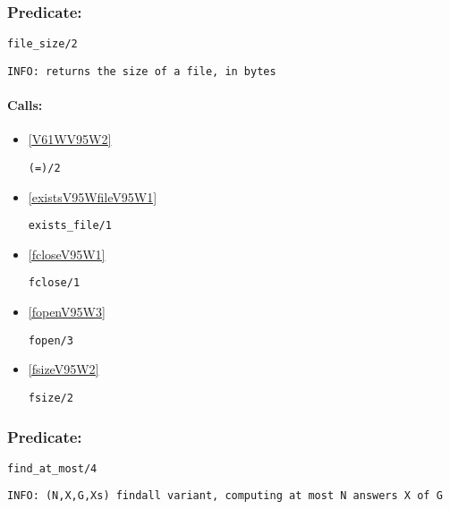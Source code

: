 \subsubsection{Predicate:} \label{fileV95WsizeV95W2}

\begin{verbatim}
file_size/2
\end{verbatim}

{\small \begin{verbatim}
INFO: returns the size of a file, in bytes

\end{verbatim}}
\paragraph{Calls:} 
\begin{itemize}
\item \ref{V61WV95W2} 
\begin{verbatim}
(=)/2
\end{verbatim}

\item \ref{existsV95WfileV95W1} 
\begin{verbatim}
exists_file/1
\end{verbatim}

\item \ref{fcloseV95W1} 
\begin{verbatim}
fclose/1
\end{verbatim}

\item \ref{fopenV95W3} 
\begin{verbatim}
fopen/3
\end{verbatim}

\item \ref{fsizeV95W2} 
\begin{verbatim}
fsize/2
\end{verbatim}

\end{itemize}

\subsubsection{Predicate:} \label{findV95WatV95WmostV95W4}

\begin{verbatim}
find_at_most/4
\end{verbatim}

{\small \begin{verbatim}
INFO: (N,X,G,Xs) findall variant, computing at most N answers X of G

\end{verbatim}}
